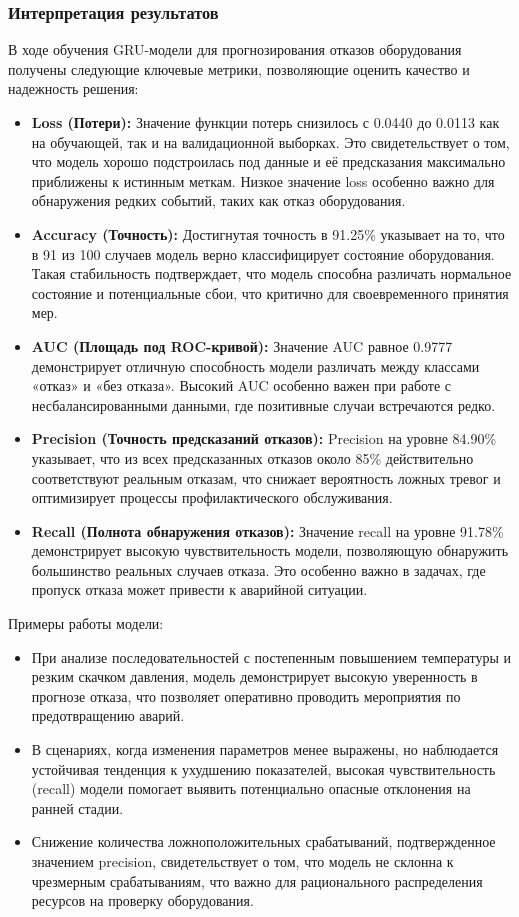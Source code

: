\documentclass[a4paper,12pt]{article}
\begin{document}
\begin{flushleft}
\subsubsection{Интерпретация результатов}

В ходе обучения GRU-модели для прогнозирования отказов оборудования получены следующие ключевые метрики, позволяющие оценить качество и надежность решения:
\begin{itemize}
    \item \textbf{Loss (Потери):} Значение функции потерь снизилось с 0.0440 до 0.0113 как на обучающей, так и на валидационной выборках. Это свидетельствует о том, что модель хорошо подстроилась под данные и её предсказания максимально приближены к истинным меткам. Низкое значение loss особенно важно для обнаружения редких событий, таких как отказ оборудования.
    \item \textbf{Accuracy (Точность):} Достигнутая точность в 91.25\% указывает на то, что в 91 из 100 случаев модель верно классифицирует состояние оборудования. Такая стабильность подтверждает, что модель способна различать нормальное состояние и потенциальные сбои, что критично для своевременного принятия мер.
    \item \textbf{AUC (Площадь под ROC-кривой):} Значение AUC равное 0.9777 демонстрирует отличную способность модели различать между классами «отказ» и «без отказа». Высокий AUC особенно важен при работе с несбалансированными данными, где позитивные случаи встречаются редко.
    \item \textbf{Precision (Точность предсказаний отказов):} Precision на уровне 84.90\% указывает, что из всех предсказанных отказов около 85\% действительно соответствуют реальным отказам, что снижает вероятность ложных тревог и оптимизирует процессы профилактического обслуживания.
    \item \textbf{Recall (Полнота обнаружения отказов):} Значение recall на уровне 91.78\% демонстрирует высокую чувствительность модели, позволяющую обнаружить большинство реальных случаев отказа. Это особенно важно в задачах, где пропуск отказа может привести к аварийной ситуации.
\end{itemize}

Примеры работы модели:
\begin{itemize}
    \item При анализе последовательностей с постепенным повышением температуры и резким скачком давления, модель демонстрирует высокую уверенность в прогнозе отказа, что позволяет оперативно проводить мероприятия по предотвращению аварий.
    \item В сценариях, когда изменения параметров менее выражены, но наблюдается устойчивая тенденция к ухудшению показателей, высокая чувствительность (recall) модели помогает выявить потенциально опасные отклонения на ранней стадии.
    \item Снижение количества ложноположительных срабатываний, подтвержденное значением precision, свидетельствует о том, что модель не склонна к чрезмерным срабатываниям, что важно для рационального распределения ресурсов на проверку оборудования.
\end{itemize}


\end{flushleft}
\end{document}
